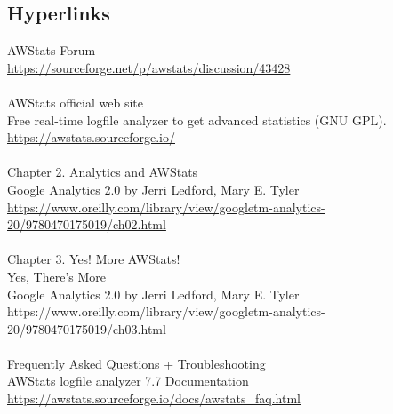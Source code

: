 
\subsection{Hyperlinks}


AWStats Forum\\
\href{https://sourceforge.net/p/awstats/discussion/43428}{https://sourceforge.net/p/awstats/discussion/43428}\\
\\
AWStats official web site\\
Free real-time logfile analyzer to get advanced statistics (GNU GPL).\\
\href{https://awstats.sourceforge.io/}{https://awstats.sourceforge.io/}\\
\\
Chapter 2. Analytics and AWStats\\
Google Analytics 2.0 by Jerri Ledford, Mary E. Tyler\\
\href{https://www.oreilly.com/library/view/googletm-analytics-20/9780470175019/ch02.html}{https://www.oreilly.com/library/view/googletm-analytics-20/9780470175019/ch02.html}\\
\\
Chapter 3. Yes! More AWStats!\\
Yes, There’s More\\
Google Analytics 2.0 by Jerri Ledford, Mary E. Tyler\\
https://www.oreilly.com/library/view/googletm-analytics-20/9780470175019/ch03.html\\
\\
Frequently Asked Questions + Troubleshooting\\
AWStats logfile analyzer 7.7 Documentation\\
\href{https://awstats.sourceforge.io/docs/awstats\_faq.html}{https://awstats.sourceforge.io/docs/awstats\_faq.html}
